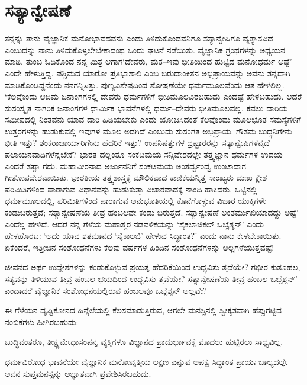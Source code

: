 \section*{ಸತ್ಯಾನ್ವೇಷಣೆ}


ತನ್ನನ್ನು ತಾನು ವೈಜ್ಞಾನಿಕ ಮನೋಭಾವದವನು ಎಂದು ತಿಳಿದುಕೊಂಡವನಿಗೂ ಸತ್ಯಾನ್ವೇಷಿಗೂ ವ್ಯತ್ಯಾಸವಿದೆ ಎಂಬುದನ್ನು ನಾನು ತಿಳಿದುಕೊಳ್ಳಲೇಬೇಕಾದಂಥ ಒಂದು ಘಟನೆ ನಡೆಯಿತು. ವೈಜ್ಞಾನಿಕ ಗ್ರಂಥಗಳನ್ನು ಅಧ್ಯಯನ ಮಾಡಿ, ತುಂಬ ಓದಿಕೊಂಡ ನನ್ನ ಮಿತ್ರ ಆಗಾಗ\break ‘ದೇವರು, ಮತ–ಇವು ಭೀತಿಯಿಂದ ಹುಟ್ಟಿದ ಮನೋಧರ್ಮ ಅಷ್ಟೆ’ ಎಂದೇ ಹೇಳುತ್ತಿದ್ದ. ಪಶ್ಚಿಮದ ಯಾರೋ ಪ್ರತಿಭಾಶಾಲಿ ಎಂಬ ಬಿರುದಾಂಕಿತನ ಅಭಿಪ್ರಾಯವನ್ನು ಅವನು ತನ್ನದಾಗಿ ಮಾಡಿಕೊಂಡಿದ್ದನೆಂದು ನನಗನ್ನಿಸಿತ್ತು. ಪುಣ್ಯವಿಶೇಷದಿಂದ ಶೋಷಣೆಯೇ ಧರ್ಮ\break ಮೂಲವೆಂದು ಆತ ಹೇಳಲಿಲ್ಲ. ‘ಕೆಲವೊಂದು ಆದಿಮ ಜನಾಂಗಗಳಲ್ಲಿ ದೇವರು ಧರ್ಮಗಳಿಗೆ ಭೀತಿಮೂಲವಿರಬಹುದು ಎಂದಷ್ಟೆ ಹೇಳಬಹುದು. ಆದರೆ ಸುಸಂಸ್ಕೃತ ನಾಗರಿಕ ಜನಾಂಗಗಳ ಧಾರ್ಮಿಕ ಭಾವನೆಗಳಲ್ಲಿ ಧರ್ಮ–ದೇವರು ಭೀತಿಮೂಲವಲ್ಲ. ಕವಲು ದಾರಿಯ ಸಮೀಪದಲ್ಲಿ ನಿಂತವನು ಯಾವ ದಾರಿ ಹಿಡಿಯಬೇಕು ಎಂದು ಯೋಚಿಸಿದಂತೆ ಕೆಲವೊಂದು ಮೂಲಭೂತ ಸಮಸ್ಯೆಗಳಿಗೆ ಉತ್ತರಗಳನ್ನು ಹುಡುಕುವಲ್ಲಿ ಇವುಗಳ ಮೂಲ ಅಡಗಿದೆ ಎಂಬುದು ಸುಸಂಗತ ಅಭಿಪ್ರಾಯ. ಗೌತಮ ಬುದ್ಧನಿಗೇನು ಭೀತಿ ಇತ್ತು? ಶಂಕರಾಚಾರ್ಯರಿಗೇನು ಹೆದರಿಕೆ ಇತ್ತು? ಉಪನಿಷತ್ತುಗಳ ದ್ರಷ್ಟಾರರನ್ನು ಸತ್ಯಾನ್ವೇಷಿಗಳೆನ್ನದೆ ಪಲಾಯನವಾದಿಗಳೆನ್ನಬೇಕೆ? ಭಾರತ ದಲ್ಲಂತೂ ಸಂಕಟಮಯ ಸನ್ನಿವೇಶದಲ್ಲೇ ತತ್ತ್ವಜ್ಞಾನ ಧರ್ಮಗಳ ಉದಯ ಎಂದರೆ ತಪ್ಪಾ ಗದು. ಮಹಾವೀರನಾದ ಅರ್ಜುನನಿಗೆ ಸಂಕಟಮಯ ಅಂತರ್ದ್ವಂದ್ವ ಉಂಟಾದಾಗ ಗೀತೋಪದೇಶ\-ವಾಯಿತು. ಭಾರತೀಯ ತತ್ತ್ವಶಾಸ್ತ್ರಕ್ಕೆ ಮೌಲಿಕವಾದ ಕಾಣಿಕೆಯನ್ನಿತ್ತ ಸಾಂಖ್ಯರು ದುಃಖ ಕ್ಲೇಶ ಪರಿಮಿತಿಗಳಿಂದ ಪಾರಾಗುವ ವಿಧಾನವನ್ನು ಹುಡುಕುತ್ತಾ ವಿಚಾರವಾದಕ್ಕೆ ನಾಂದಿ ಹಾಕಿದರು. ಒಟ್ಟಿನಲ್ಲಿ ಧರ್ಮಮೂಲದಲ್ಲಿ, ಪರಿಮಿತಿಗಳಿಂದ ಪಾರಾಗುವ ಅನುಭೂತಿಯಲ್ಲಿ ಕೊನೆಗೊಳ್ಳುವ ವಿಚಾರ ಯುಕ್ತಿಗಳೇ ಕಂಡುಬರುತ್ತವೆ; ಸತ್ಯಾನ್ವೇಷಣೆಯ ತೀವ್ರ ಹಂಬಲವೇ ಕಂಡು ಬರುತ್ತದೆ. ಸತ್ಯಾನ್ವೇಷಣೆ ಅಂತರ್ಮುಖಿಯಾದದ್ದು ಅಷ್ಟೆ’ ಎಂದೆಲ್ಲ ಹೇಳಿದೆ. ಆದರೆ ನನ್ನ ಗೆಳೆಯ ಮಹಾತ್ಮರ ನಡವಳಿಕೆಯನ್ನು ‘ಸೈಕಲಾಜಿಕಲ್ ಒಬ್ಸೆಶ್ಶನ್​’ ಎಂದು ಹೇಳಹೊರಟ: ‘ಅದು ಯಾವ ಶತಮಾನದ ‘ಸೈಕಾಲಜಿ’ ಹೇಳುವ ಸಿದ್ಧಾಂತ?’ ಎಂದು ನಾನು ಕೇಳಬೇಕಾಯಿತು. ಏಕೆಂದರೆ, ಇತ್ತೀಚಿನ ಸಂಶೋಧನೆಗಳು ಕೆಲವು ವರ್ಷಗಳ ಹಿಂದಿನ ಸಂಶೋಧನೆಗಳನ್ನು ಅಲ್ಲಗಳೆಯುತ್ತವಷ್ಟೆ!

ಜೀವನದ ಅರ್ಥ ಉದ್ದೇಶಗಳನ್ನು ಕಂಡುಕೊಳ್ಳುವ ಪ್ರಯತ್ನ ಹೆದರಿಕೆಯಿಂದ ಉದ್ಭವಿಸು ತ್ತದೆಯೇ? ಗಭೀರ ಕುತೂಹಲ, ಸತ್ಯವನ್ನು ತಿಳಿಯುವ ತೀವ್ರ ಹಂಬಲ ಭಯದಿಂದ ಉದ್ಭವಿಸು ತ್ತವೆಯೇ? ಸತ್ಯಾನ್ವೇಷಣೆಯ ತೀವ್ರ ಹಂಬಲ ಒಬ್ಸೆಶ್ಶನ್​’ ಎಂದಾದರೆ ವೈಜ್ಞಾನಿಕ ಸಂಶೋಧನೆ\-ಯಲ್ಲಿರುವ ಹಂಬಲವೂ ಒಬ್ಸೆಶ್ಶನ್ ಅಲ್ಲವೇ?

ಈ ಗೆಳೆಯನ ದೃಷ್ಟಿಕೋನದ ಹಿನ್ನೆಲೆಯಲ್ಲಿ ಕೆಲಸಮಾಡುತ್ತಿರುವ, ಆಗಲೇ ಮನಸ್ಸಿನಲ್ಲಿ ಸ್ವೀಕೃತವಾಗಿ ಹೆಪ್ಪುಗಟ್ಟಿದ ನಂಬಿಕೆಗಳು ಹೀಗಿರಬಹುದು:

ಬುದ್ಧಿವಂತರೂ, ತೀಕ್ಷ್ಣಮೇಧಾಸಂಪನ್ನ ವ್ಯಕ್ತಿಗಳೂ ವಿಜ್ಞಾನದ ಪ್ರಾದುರ್ಭಾವಕ್ಕೆ ಮೊದಲು ಹುಟ್ಟಿರಲು ಸಾಧ್ಯವಿಲ್ಲ.

ಧರ್ಮವಿರೋಧ ಭಾವನೆಯೇ ವೈಜ್ಞಾನಿಕ ಮನೋವೃತ್ತಿಯ ಲಕ್ಷಣ ಎನ್ನುವ ಅಪಕ್ವ ಸಿದ್ಧಾಂತ ಪ್ರಾಯಃ ಬಾಲ್ಯದಲ್ಲೇ ಅವನ ಸುಪ್ತಮನಸ್ಸನ್ನು ಅಜ್ಞಾತವಾಗಿ ಪ್ರವೇಶಿಸಿರಬಹುದು.

